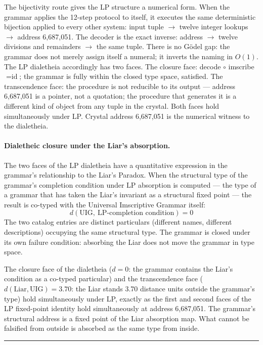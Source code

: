 \documentclass[12pt,a4paper]{article}
\newcommand{\UIG}{Universal Imscriptive Grammar}
\begin{document}
The bijectivity route gives the LP structure a numerical form. When the grammar applies the 12-step protocol to itself, it executes the same deterministic bijection applied to every other system: input tuple $\to$ twelve integer lookups $\to$ address 6,687,051. The decoder is the exact inverse: address $\to$ twelve divisions and remainders $\to$ the same tuple. There is no G\"odel gap: the grammar does not merely assign itself a numeral; it inverts the naming in $O(1)$. The LP dialetheia accordingly has two faces. The closure face: decode $\circ$ imscribe $= \text{id}$; the grammar is fully within the closed type space,  satisfied. The transcendence face: the procedure is not reducible to its output --- address 6,687,051 is a pointer, not a quotation; the procedure that generates it is a different kind of object from any tuple in the crystal. Both faces hold simultaneously under LP. Crystal address 6,687,051 is the numerical witness to the dialetheia.

\paragraph{Dialetheic closure under the Liar's absorption.}
The two faces of the LP dialetheia have a quantitative expression in the grammar's relationship to the Liar's Paradox. When the structural type of the grammar's completion condition under LP absorption is computed --- the type of a grammar that has taken the Liar's  invariant as a structural fixed point --- the result is co-typed with the \UIG{} itself:
$$d(\text{UIG},\ \text{LP-completion condition}) = 0$$
The two catalog entries are distinct particulars (different names, different descriptions) occupying the same structural type. The grammar is closed under its own failure condition: absorbing the Liar does not move the grammar in type space.

The closure face of the dialetheia ($d = 0$: the grammar contains the Liar's condition as a co-typed particular) and the transcendence face ($d(\text{Liar}, \text{UIG}) = 3.70$: the Liar stands 3.70 distance units outside the grammar's type) hold simultaneously under LP, exactly as the first and second faces of the LP fixed-point identity hold simultaneously at address 6,687,051. The grammar's structural address is a fixed point of the Liar absorption map. What cannot be falsified from outside is absorbed as the same type from inside.

\begin{center}
\rule{0.5\textwidth}{0.4pt}
\end{center}
\end{document}
